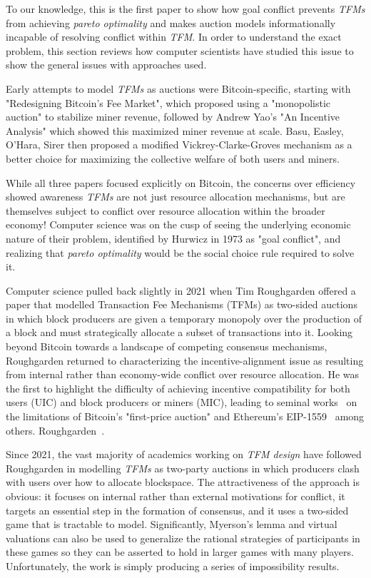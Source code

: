 
To our knowledge, this is the first paper to show how goal conflict prevents \textit{TFMs} from achieving \textit{pareto optimality} and makes auction models informationally incapable of resolving conflict within \textit{TFM}. In order to understand the exact problem, this section reviews how computer scientists have studied this issue to show the general issues with approaches used.

Early attempts to model \textit{TFMs} as auctions were Bitcoin-specific, starting with "Redesigning Bitcoin's Fee Market", which proposed using a "monopolistic auction" to stabilize miner revenue, followed by Andrew Yao's "An Incentive Analysis" which showed this maximized miner revenue at scale. Basu, Easley, O’Hara, Sirer then proposed a modified Vickrey-Clarke-Groves mechanism as a better choice for maximizing the collective welfare of both users and miners.

While all three papers focused explicitly on Bitcoin, the concerns over efficiency showed awareness \textit{TFMs} are not just resource allocation mechanisms, but are themselves subject to conflict over resource allocation within the broader economy! Computer science was on the cusp of seeing the underlying economic nature of their problem, identified by Hurwicz in 1973 as "goal conflict", and realizing that \textit{pareto optimality} would be the social choice rule required to solve it.

Computer science pulled back slightly in 2021 when Tim Roughgarden\citet{roughgarden2021,roughgarden2024transaction} offered a paper that modelled Transaction Fee Mechanisms (TFMs) as two-sided auctions in which block producers are given a temporary monopoly over the production of a block and must strategically allocate a subset of transactions into it. Looking beyond Bitcoin towards a landscape of competing consensus mechanisms, Roughgarden returned to characterizing the incentive-alignment issue as resulting from internal rather than economy-wide conflict over resource allocation. He was the first to highlight the difficulty of achieving incentive compatibility for both users (UIC) and block producers or miners (MIC), leading to seminal works~\cite {roughgarden2021,roughgarden2024transaction} on the limitations of Bitcoin's "first-price auction" and Ethereum's EIP-1559~\cite{buterin2019eip} among others. Roughgarden~\cite{roughgarden2021,roughgarden2024transaction}.

Since 2021, the vast majority of academics working on \textit{TFM design} have followed Roughgarden in modelling \textit{TFMs} as two-party auctions in which producers clash with users over how to allocate blockspace. The attractiveness of the approach is obvious: it focuses on internal rather than external motivations for conflict, it targets an essential step in the formation of consensus, and it uses a two-sided game that is tractable to model. Significantly, Myerson's lemma and virtual valuations can also be used to generalize the rational strategies of participants in these games so they can be asserted to hold in larger games with many players. Unfortunately, the work is simply producing a series of impossibility results.

